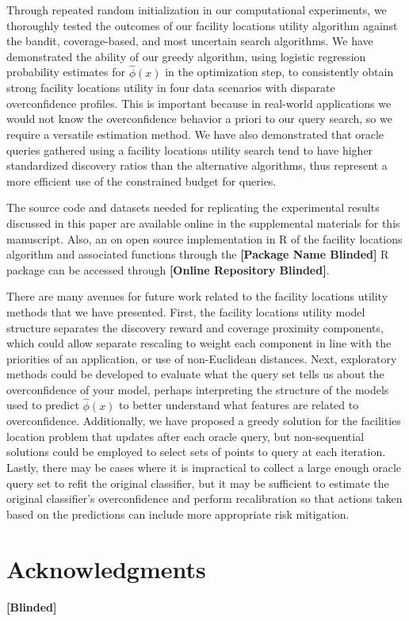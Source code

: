\documentclass[letterpaper]{article} %
\begin{document}
Through repeated random initialization in our computational experiments, we thoroughly tested the outcomes of our facility locations utility algorithm against the bandit, coverage-based, and most uncertain search algorithms. We have demonstrated the ability of our greedy algorithm, using logistic regression probability estimates for $\hat{\phi}(x)$ in the optimization step, to consistently obtain strong facility locations utility in four data scenarios with disparate overconfidence profiles. This is important because in real-world applications we would not know the overconfidence behavior a priori to our query search, so we require a versatile estimation method. We have also demonstrated that oracle queries gathered using a facility locations utility search tend to have higher standardized discovery ratios than the alternative algorithms, thus represent a more efficient use of the constrained budget for queries. 

The source code and datasets needed for replicating the experimental results discussed in this paper are available online in the supplemental materials for this manuscript. Also, an on open source  implementation in R \citep{R} of the facility locations algorithm and associated functions through the \textbf{[Package Name Blinded]} R package can be accessed through \textbf{[Online Repository Blinded]}.

There are many avenues for future work related to the facility locations utility methods that we have presented. First, the facility locations utility model structure separates the discovery reward and coverage proximity components, which could allow separate rescaling to weight each component in line with the priorities of an application, or use of non-Euclidean distances. Next, exploratory methods could be developed to evaluate what the query set tells us about the overconfidence of your model, perhaps interpreting the structure of the models used to predict $\hat{\phi}(x)$ to better understand what features are related to overconfidence. Additionally, we have proposed a greedy solution for the facilities location problem that updates after each oracle query, but non-sequential solutions could be employed to select sets of points to query at each iteration. Lastly, there may be cases where it is impractical to collect a large enough oracle query set to refit the original classifier, but it may be sufficient to estimate the original classifier’s overconfidence and perform recalibration so that actions taken based on the predictions can include more appropriate risk mitigation. 

\section{Acknowledgments} 

\textbf{[Blinded]}

\newpage



\end{document}
